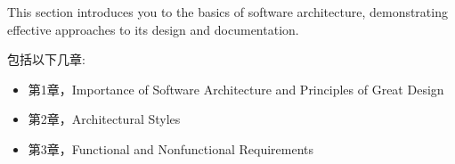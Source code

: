 
This section introduces you to the basics of software architecture, demonstrating effective approaches to its design and documentation.

包括以下几章:

\begin{itemize}
\item 第1章，Importance of Software Architecture and Principles of Great Design
\item 第2章，Architectural Styles
\item 第3章，Functional and Nonfunctional Requirements
\end{itemize}